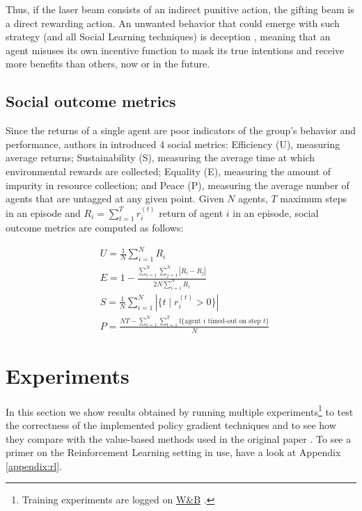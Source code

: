 \documentclass{article}
\begin{document}
Thus, if the laser beam consists of an indirect punitive action, the gifting beam is a direct rewarding action. An unwanted behavior that could emerge with such strategy (and all Social Learning techniques) is deception \cite{social-learning}, meaning that an agent misuses its own incentive function to mask its true intentions and receive more benefits than others, now or in the future.

\subsection{Social outcome metrics}
Since the returns of a single agent are poor indicators of the group's behavior and performance, authors in \cite{harvest} introduced $4$ social metrics: Efficiency (U), measuring average returns; Sustainability (S), measuring the average time at which environmental rewards are collected; Equality (E), measuring the amount of impurity in resource collection; and Peace (P), measuring the average number of agents that are untagged at any given point. Given $N$ agents, $T$ maximum steps in an episode and $R_i=\sum_{t=1}^T r_i^{(t)}$ return of agent $i$ in an episode, social outcome metrics are computed as follows:

\begin{equation}
  \label{eq:metrics}
  \begin{aligned}
    & U = \frac{1}{N}\sum_{i=1}^N R_i\\
    & E = 1 - \frac{\sum_{i=1}^N\sum_{j=1}^N |R_i-R_j|}{2N\sum_{i=1}^N R_i} \\
    & S = \frac{1}{N}\sum_{i=1}^N |\{t\mid r_i^{(t)}>0\}| \\
    & P = \frac{NT-\sum_{i=1}^N\sum_{t=1}^T \mathbb{I}\{\text{agent } i \text{ timed-out on step } t\}}{N}
  \end{aligned}
\end{equation}

\section{Experiments}
In this section we show results obtained by running multiple experiments\footnote{Training experiments are logged on \href{https://wandb.ai/wadaboa/cpr-appropriation}{W\&B} \cite{wandb}.} to test the correctness of the implemented policy gradient techniques and to see how they compare with the value-based methods used in the original paper \cite{harvest}. To see a primer on the Reinforcement Learning setting in use, have a look at Appendix \ref{appendix:rl}.
\end{document}
